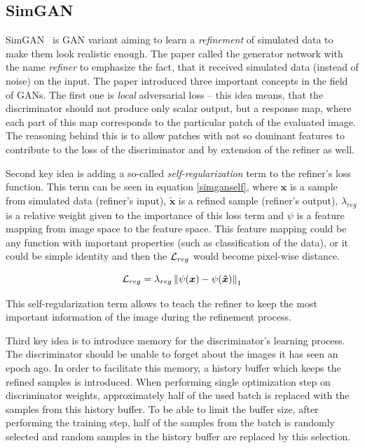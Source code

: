 \subsection{SimGAN}

SimGAN~\cite{historypool} is GAN variant aiming to learn a {\em refinement} of simulated data to make them look realistic enough. The paper called the generator network with the name {\em refiner} to emphasize the fact, that it received simulated data (instead of noise) on the input. The paper introduced three important concepts in the field of GANs. The first one is {\em local} adversarial loss -- this idea means, that the discriminator should not produce only scalar output, but a response map, where each part of this map corresponds to the particular patch of the evaluated image. The reasoning behind this is to allow patches with not so dominant features to contribute to the loss of the discriminator and by extension of the refiner as well.

Second key idea is adding a so-called {\em self-regularization} term to the refiner's loss function. This term can be seen in equation \ref{simganself}, where $\bm{x}$ is a sample from simulated data (refiner's input), $\bm{\tilde{x}}$ is a refined sample (refiner's output), $\lambda_{reg}$ is a relative weight given to the importance of this loss term and $\psi$ is a feature mapping from image space to the feature space. This feature mapping could be any function with important properties (such as classification of the data), or it could be simple identity and then the $\mathcal{L}_{reg}$ would become pixel-wise distance.

\begin{equation}
\mathcal{L}_{reg} = \lambda_{reg}\left\lVert\psi({\bm{x}}) - \psi({\bm{\tilde{x}}})\right\rVert_1
\label{simganself}
\end{equation}

This self-regularization term allows to teach the refiner to keep the most important information of the image during the refinement process.

Third key idea is to introduce memory for the discriminator's learning process. The discriminator should be unable to forget about the images it has seen an epoch ago. In order to facilitate this memory, a history buffer which keeps the refined samples is introduced. When performing single optimization step on discriminator weights, approximately half of the used batch is replaced with the samples from this history buffer. To be able to limit the buffer size, after performing the training step, half of the samples from the batch is randomly selected and random samples in the history buffer are replaced by this selection.

